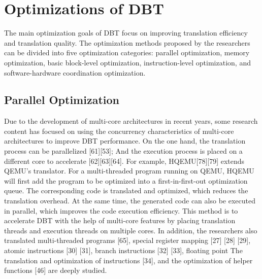 \section{Optimizations of DBT}
\label{sec:optimizations}

The main optimization goals of DBT focus on improving translation efficiency and translation quality.
The optimization methods proposed by the researchers can be divided into five optimization categories: parallel optimization, memory optimization, basic block-level optimization, instruction-level optimization, and software-hardware coordination optimization.

\subsection{Parallel Optimization}
Due to the development of multi-core architectures in recent years, some research content has focused on using the concurrency characteristics of multi-core architectures to improve DBT performance.
On the one hand, the translation process can be parallelized [61][53]; And the execution process is placed on a different core to accelerate [62][63][64].
For example, HQEMU[78][79] extends QEMU's translator.
For a multi-threaded program running on QEMU, HQEMU will first add the program to be optimized into a first-in-first-out optimization queue.
The corresponding code is translated and optimized, which reduces the translation overhead.
At the same time, the generated code can also be executed in parallel, which improves the code execution efficiency.
This method is to accelerate DBT with the help of multi-core features by placing translation threads and execution threads on multiple cores.
In addition, the researchers also translated multi-threaded programs [65], special register mapping [27] [28] [29], atomic instructions [30] [31], branch instructions [32] [33], floating point The translation and optimization of instructions [34], and the optimization of helper functions [46] are deeply studied.

